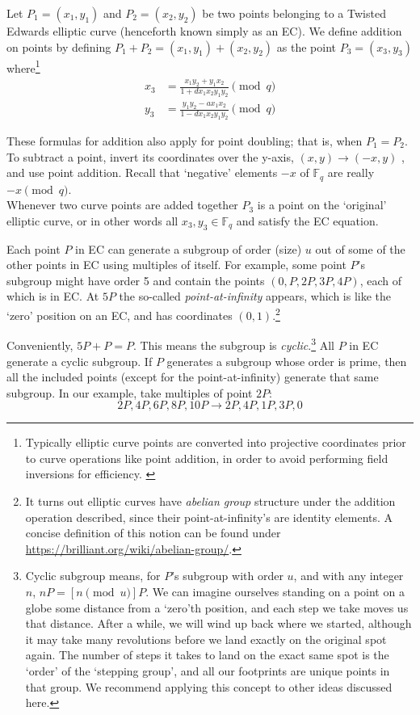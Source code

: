 Let \(P_1 = (x_1, y_1)\) and \(P_2 = (x_2, y_2)\) be two points belonging to a Twisted Edwards elliptic curve (henceforth known simply as an EC). We define addition on points by defining $P_1 + P_2 = (x_1, y_1) + (x_2, y_2)$ as the point $P_3 = (x_3, y_3)$ where\footnote{Typically elliptic curve points are converted into projective coordinates prior to curve operations like point addition, in order to avoid performing field inversions for efficiency. \cite{ecc-projective}}\vspace{.175cm}
\begin{align*}
x_3 & =  \frac{x_1 y_2 + y_1 x_ 2}{1 + d x_1 x_2 y_1 y_2}  \pmod{q} \\
y_3 & =  \frac{y_1 y_2 - a x_1 x_2}{1 - d x_1 x_2 y_1 y_2} \pmod{q} 
\end{align*}

These formulas for addition also apply for point doubling; that is, when  \(P_1 = P_2\). To subtract a point, invert its coordinates over the y-axis, $(x,y) \rightarrow (-x,y)$ \cite{Bernstein2008}, and use point addition. Recall that `negative' elements $-x$ of $\mathbb{F}_q$ are really $-x \pmod{q}$.
\\

Whenever two curve points are added together $P_3$ is a point on the `original' elliptic curve, or in other words all $x_3,y_3 \in \mathbb{F}_q$ and satisfy the EC equation.

Each point $P$ in EC can generate a subgroup of order (size) $u$ out of some of the other points in EC using multiples of itself. For example, some point $P$’s subgroup might have order 5 and contain the points $(0, P, 2P, 3P, 4P)$, each of which is in EC. At $5P$ the so-called {\em point-at-infinity} appears, which is like the `zero’ position on an EC, and has coordinates $(0, 1)$.\footnote{It turns out elliptic curves have {\em abelian group} structure under the addition operation described, since their point-at-infinity's are identity elements. A concise definition of this notion can be found under \url{https://brilliant.org/wiki/abelian-group/}.}

Conveniently, $5P + P = P$. This means the subgroup is {\em cyclic}.\footnote{\label{cyclical_note}Cyclic subgroup means, for $P$'s subgroup with order $u$, and with any integer $n$, $n P = [n \pmod{u}] P$. We can imagine ourselves standing on a point on a globe some distance from a `zero'th position, and each step we take moves us that distance. After a while, we will wind up back where we started, although it may take many revolutions before we land exactly on the original spot again. The number of steps it takes to land on the exact same spot is the `order' of the `stepping group', and all our footprints are unique points in that group. We recommend applying this concept to other ideas discussed here.} All $P$ in EC generate a cyclic subgroup. If $P$ generates a subgroup whose order is prime, then all the included points (except for the point-at-infinity) generate that same subgroup. In our example, take multiples of point $2P$:\vspace{.175cm}
\[2P, 4P, 6P, 8P, 10P \rightarrow 2P, 4P, 1P, 3P, 0\]

